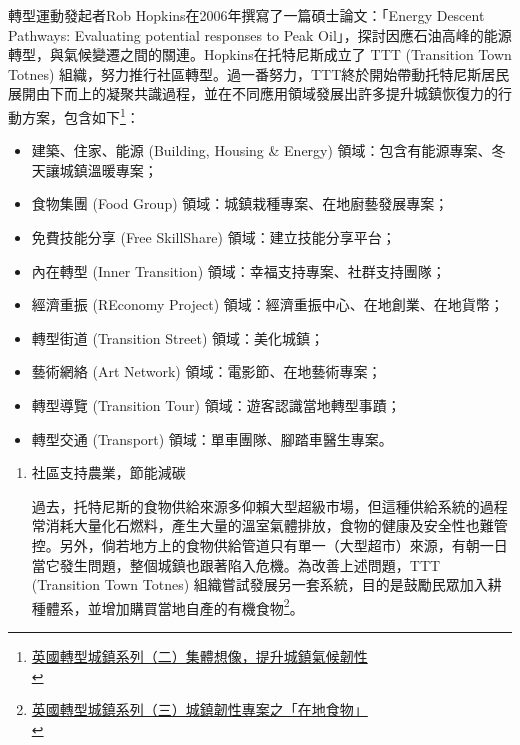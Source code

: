 \documentclass[a4paper,12pt]{article}
\begin{document}
\begin{enumerate}
轉型運動發起者Rob Hopkins在2006年撰寫了一篇碩士論文：「Energy Descent Pathways: Evaluating potential responses to Peak Oil」，探討因應石油高峰的能源轉型，與氣候變遷之間的關連。Hopkins在托特尼斯成立了 TTT (Transition Town Totnes) 組織，努力推行社區轉型。過一番努力，TTT終於開始帶動托特尼斯居民展開由下而上的凝聚共識過程，並在不同應用領域發展出許多提升城鎮恢復力的行動方案，包含如下\footnote{\href{https://lowestc.blogspot.com/2016/12/blog-post\_15.html}{英國轉型城鎮系列（二）集體想像，提升城鎮氣候韌性 }\\}：\\
\begin{itemize}
\item 建築、住家、能源 (Building, Housing \& Energy) 領域：包含有能源專案、冬天讓城鎮溫暖專案；\\
\item 食物集團 (Food Group) 領域：城鎮栽種專案、在地廚藝發展專案；\\
\item 免費技能分享 (Free SkillShare) 領域：建立技能分享平台；\\
\item 內在轉型 (Inner Transition) 領域：幸福支持專案、社群支持團隊；\\
\item 經濟重振 (REconomy Project) 領域：經濟重振中心、在地創業、在地貨幣；\\
\item 轉型街道 (Transition Street) 領域：美化城鎮；\\
\item 藝術網絡 (Art Network) 領域：電影節、在地藝術專案；\\
\item 轉型導覽 (Transition Tour) 領域：遊客認識當地轉型事蹟；\\
\item 轉型交通 (Transport) 領域：單車團隊、腳踏車醫生專案。\\
\end{itemize}
\begin{enumerate}
\item 社區支持農業，節能減碳
\label{sec:org035dfca}

過去，托特尼斯的食物供給來源多仰賴大型超級市場，但這種供給系統的過程常消耗大量化石燃料，產生大量的溫室氣體排放，食物的健康及安全性也難管控。另外，倘若地方上的食物供給管道只有單一（大型超市）來源，有朝一日當它發生問題，整個城鎮也跟著陷入危機。為改善上述問題，TTT (Transition Town Totnes) 組織嘗試發展另一套系統，目的是鼓勵民眾加入耕種體系，並增加購買當地自產的有機食物\footnote{\href{https://lowestc.blogspot.com/2017/02/blog-post\_6.html}{英國轉型城鎮系列（三）城鎮韌性專案之「在地食物」 }\\\label{org6f347a0}}。\\


\end{enumerate}
\end{enumerate}
\end{document}
